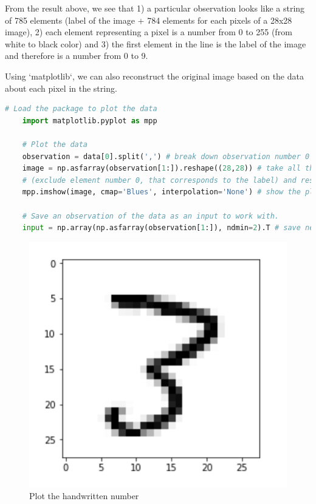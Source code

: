 From the result above, we see that 1) a particular observation looks like a string of 785 elements (label of the image + 784 elements for each pixels of a 28x28 image), 2) each element representing a pixel is a number from 0 to 255 (from white to black color) and 3) the first element in the line is the label of the image and therefore is a number from 0 to 9.

Using `matplotlib`, we can also reconstruct the original image based on the data about each pixel in the string.

\begin{lstlisting}[language=Python]
    # Load the package to plot the data
    import matplotlib.pyplot as mpp

    # Plot the data
    observation = data[0].split(',') # break down observation number 0 (comma is used to identify each element).
    image = np.asfarray(observation[1:]).reshape((28,28)) # take all the elements starting from the element 1 
    # (exclude element number 0, that corresponds to the label) and reshape them as an array with dimension 28 by 28.
    mpp.imshow(image, cmap='Blues', interpolation='None') # show the plot of this array using grey pallete.

    # Save an observation of the data as an input to work with.
    input = np.array(np.asfarray(observation[1:]), ndmin=2).T # save necessary elements in a vertical vector shape.
\end{lstlisting}

\begin{figure}[H]
   \includegraphics[width=\linewidth]{pics/3.png}
   \caption{\label{fig:number3} Plot the handwritten number}
\end{figure}

